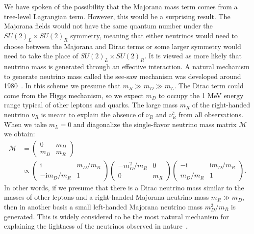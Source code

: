 We have spoken of the possibility that the Majorana mass term comes from a tree-level Lagrangian term.  However, this would be a surprising result.  The Majorana fields would not have the same quantum number under the $SU(2)_L\times SU(2)_R$ symmetry, meaning that either neutrinos would need to choose between the Majorana and Dirac terms or some larger symmetry would need to take the place of $SU(2)_L\times SU(2)_R$.  It is viewed as more likely that neutrino mass is generated through an effective interaction.  A natural mechanism to generate neutrino mass called the see-saw mechanism was developed around 1980~\cite{PhysRevLett.44.912,GellMann:1980vs}.  In this scheme we presume that $m_R \gg m_D \gg m_L$.  The Dirac term could come from the Higgs mechanism, so we expect $m_D$ to occupy the 1 MeV energy range typical of other leptons and quarks.  The large mass $m_R$ of the right-handed neutrino $\nu_R$ is meant to explain the absence of $\nu_R$ and $\overline{\nu_R^c}$ from all observations.  When we take $m_L = 0$ and diagonalize the single-flavor neutrino mass matrix $\mathcal{M}$ we obtain:
\begin{align}
\mathcal{M} &= \begin{pmatrix}0 & m_D \\ m_D & m_R \end{pmatrix}\\
&\propto \begin{pmatrix} \mathrm{i} & m_D/m_R \\ -\mathrm{i}m_D/m_R & 1 \end{pmatrix}
\begin{pmatrix} -m_D^2/m_R & 0 \\ 0 & m_R\end{pmatrix}
\begin{pmatrix}-\mathrm{i} & \mathrm{i}m_D/m_R \\ m_D/m_R & 1 \end{pmatrix}.
\end{align}
In other words, if we presume that there is a Dirac neutrino mass similar to the masses of other leptons and a right-handed Majorana neutrino mass $m_R \gg m_D$, then in another basis a small left-handed Majorana neutrino mass $m_D^2/m_R$ is generated.  This is widely considered to be the most natural mechanism for explaining the lightness of the neutrinos observed in nature~\cite{RMPbb0n,mohapatra1998massive}.

